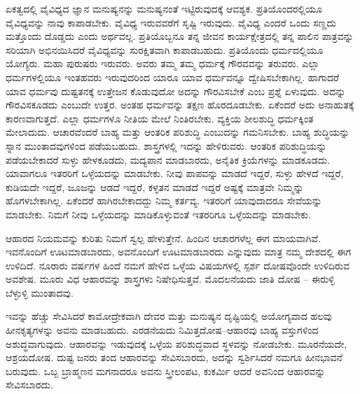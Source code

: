 ಏಕತ್ವದಲ್ಲಿ ವೈವಿಧ್ಯದ ಜ್ಞಾನ ಮನುಷ್ಯನನ್ನು ಮನುಷ್ಯನಂತೆ ಇಟ್ಟಿರುವುದಕ್ಕೆ ಆವಶ್ಯಕ. ಪ್ರತಿಯೊಂದರಲ್ಲಿಯೂ ವೈವಿಧ್ಯವನ್ನು ನಾವು ಕಾಪಾಡಬೇಕು. ವೈವಿಧ್ಯ ಇರುವವರೆಗೆ ಸೃಷ್ಟಿ ಇರುವುದು. ವೈವಿಧ್ಯ ಎಂದರೆ ಒಂದು ಸಣ್ಣದು ಮತ್ತೊಂದು ದೊಡ್ಡದು ಎಂದು ಅರ್ಥವಲ್ಲ. ಪ್ರತಿಯೊಬ್ಬನೂ ತನ್ನ ಜೀವನ ಕಾರ್ಯಕ್ಷೇತ್ರದಲ್ಲಿ ತನ್ನ ಪಾಲಿನ ಪಾತ್ರವನ್ನು ಸರಿಯಾಗಿ ಅಭಿನಯಿಸಿದರೆ ವೈವಿಧ್ಯವನ್ನು ಸುರಕ್ಷಿತವಾಗಿ ಕಾಪಾಡಬಹುದು. ಪ್ರತಿಯೊಂದು ಧರ್ಮದಲ್ಲಿಯೂ ಯೋಗ್ಯರು. ಮಹಾ ಪುರುಷರು ಇರುವರು. ಅವರು ತಮ್ಮ ತಮ್ಮ ಧರ್ಮಕ್ಕೆ ಗೌರವವನ್ನು ತರುವರು. ಎಲ್ಲಾ ಧರ್ಮಗಳಲ್ಲಿಯೂ ಇಂತಹವರು ಇರುವುದರಿಂದ ಯಾರೂ ಯಾವ ಧರ್ಮವನ್ನೂ ದ್ವೇಷಿಸಬೇಕಾಗಿಲ್ಲ. ಹಾಗಾದರೆ ಯಾವ ಧರ್ಮವು ದುಷ್ಟತನಕ್ಕೆ ಉತ್ತೇಜನ ಕೊಡುವುದೋ ಅದನ್ನು ಗೌರವಿಸಬೇಕೆ ಎಂಬ ಪ್ರಶ್ನೆ ಏಳುವುದು. ಅದನ್ನು ಗೌರವಿಸಕೂಡದು ಎಂಬುದೇ ಉತ್ತರ. ಅಂತಹ ಧರ್ಮವನ್ನು ತಕ್ಷಣ ಹೊರದೂಡಬೇಕು. ಏಕೆಂದರೆ ಅದು ಅನಾಹುತಕ್ಕೆ ಕಾರಣವಾಗುತ್ತದೆ. ಎಲ್ಲಾ ಧರ್ಮಗಳೂ ನೀತಿಯ ಮೇಲೆ ನಿಂತಿರಬೇಕು. ವ್ಯಕ್ತಿಯ ಶೀಲಶುದ್ಧಿ ಧರ್ಮಕ್ಕಿಂತ ಮೇಲಾದುದು. ಆಚಾರವೆಂದರೆ ಬಾಹ್ಯ ಮತ್ತು ಆಂತರಿಕ ಪರಿಶುದ್ಧಿ ಎಂಬುದನ್ನು ಗಮನಿಸಬೇಕು. ಬಾಹ್ಯ ಶುದ್ಧಿಯನ್ನು ಸ್ನಾನ ಮುಂತಾದವುಗಳಿಂದ ಪಡೆಯಬಹುದು. ಶಾಸ್ತ್ರಗಳಲ್ಲಿ ಇದನ್ನು ಹೇಳಿರುವರು. ಆಂತರಿಕ ಪರಿಶುದ್ಧಿಯನ್ನು ಪಡೆಯಬೇಕಾದರೆ ಸುಳ್ಳು ಹೇಳಕೂಡದು, ಮದ್ಯಪಾನ ಮಾಡಬಾರದು, ಅನೈತಿಕ ಕ್ರಿಯೆಗಳನ್ನು ಮಾಡಕೂಡದು. ಯಾವಾಗಲೂ ಇತರರಿಗೆ ಒಳ್ಳೆಯದನ್ನು ಮಾಡಬೇಕು. ನೀವು ಪಾಪವನ್ನು ಮಾಡದೆ ಇದ್ದರೆ, ಸುಳ್ಳು ಹೇಳದೆ ಇದ್ದರೆ, ಕುಡಿಯದೇ ಇದ್ದರೆ, ಜೂಜನ್ನು ಆಡದೆ ಇದ್ದರೆ, ಕಳ್ಳತನ ಮಾಡದೆ ಇದ್ದರೆ ಅಷ್ಟಕ್ಕೆ ಮಾತ್ರವೇ ನಿಮ್ಮನ್ನು ಹೊಗಳಬೇಕಾಗಿಲ್ಲ. ಏಕೆಂದರೆ ಹಾಗಿರಬೇಕಾದದ್ದು ನಿಮ್ಮ ಕರ್ತವ್ಯ. ಇತರರಿಗೆ ಯಾವುದಾದರೂ ಸೇವೆಯನ್ನು ಮಾಡಬೇಕು. ನಿಮಗೆ ನೀವು ಒಳ್ಳೆಯದನ್ನು ಮಾಡಿಕೊಳ್ಳುವಂತೆ ಇತರರಿಗೂ ಒಳ್ಳೆಯದನ್ನು ಮಾಡಬೇಕು.

ಆಹಾರದ ನಿಯಮವನ್ನು ಕುರಿತು ನಿಮಗೆ ಸ್ವಲ್ಪ ಹೇಳುತ್ತೇನೆ. ಹಿಂದಿನ ಆಚಾರಗಳೆಲ್ಲ ಈಗ ಮಾಯವಾಗಿವೆ. ಇವನೊಂದಿಗೆ ಊಟಮಾಡಬಾರದು, ಅವನೊಂದಿಗೆ ಊಟಮಾಡಬಾರದು ಎನ್ನುವುದು ಮಾತ್ರ ನಮ್ಮ ದೇಶದಲ್ಲಿ ಈಗ ಉಳಿದಿದೆ. ನೂರಾರು ವರ್ಷಗಳ ಹಿಂದೆ ನಮಗೆ ಹೇಳಿದ ಒಳ್ಳೆಯ ವಿಷಯಗಳಲ್ಲಿ ಸ್ಪರ್ಶ ದೋಷವೊಂದೇ ಉಳಿದಿರುವ ಅವಶೇಷ. ಮೂರು ವಿಧ ಆಹಾರವನ್ನು ಶಾಸ್ತ್ರಗಳು ನಿಷೇಧಿಸುತ್ತವೆ. ಮೊದಲನೆಯದು ಜಾತಿ ದೋಷ – ಈರುಳ್ಳಿ ಬೆಳ್ಳುಳ್ಳಿ ಮುಂತಾದವು.

ಇವನ್ನು ಹೆಚ್ಚು ಸೇವಿಸಿದರೆ ಕಾಮೋದ್ರೇಕವಾಗಿ ದೇವರ ಮತ್ತು ಮನುಷ್ಯನ ದೃಷ್ಟಿಯಲ್ಲಿ ಅಯೋಗ್ಯವಾದ ಹಲವು ಹೀನಕೃತ್ಯಗಳನ್ನು ಅವನು ಮಾಡಬಹುದು. ಎರಡನೆಯದು ನಿಮಿತ್ತದೋಷ–ಆಹಾರವು ಬಾಹ್ಯ ವಸ್ತುಗಳಿಂದ ಅಶುದ್ಧವಾಗುವುದು. ಆಹಾರವನ್ನು ಇಡುವುದಕ್ಕೆ ಒಳ್ಳೆಯ ಪರಿಶುದ್ಧವಾದ ಸ್ಥಳವನ್ನು ನೋಡಬೇಕು. ಮೂರನೆಯದೇ, ಆಶ್ರಯದೋಷ. ದುಷ್ಟ ಜನರು ತಂದ ಆಹಾರವನ್ನು ಸೇವಿಸಬಾರದು, ಅದನ್ನು ಸ್ವರ್ಶಿಸಿದರೆ ನಮಗೂ ಹೀನಭಾವನೆ ಬರುವುದು. ಒಬ್ಬ ಬ್ರಾಹ್ಮಣನ ಮಗನಾದರೂ ಅವನು ಸ್ತ್ರೀಲಂಪಟ, ಕುಕರ್ಮಿ ಆದರೆ ಅವನಿಂದ ಆಹಾರವನ್ನು ಸೇವಿಸಬಾರದು.

